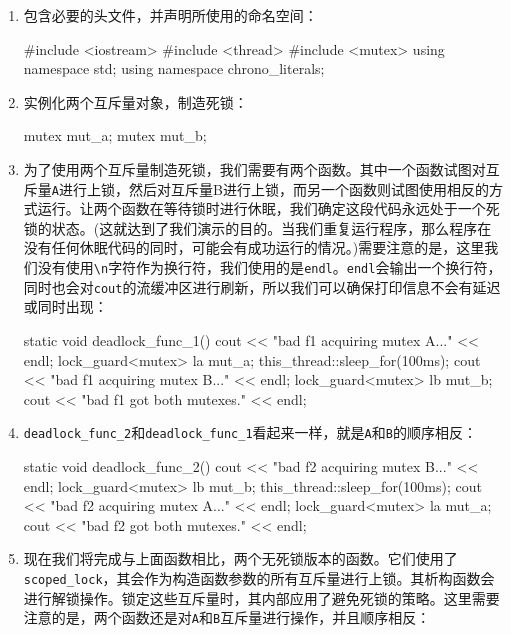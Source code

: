 \begin{enumerate}
\item 包含必要的头文件，并声明所使用的命名空间：

\begin{codebox}[cpp]
#include <iostream>
#include <thread>
#include <mutex>
using namespace std;
using namespace chrono_literals;
\end{codebox}

\item 实例化两个互斥量对象，制造死锁：

\begin{codebox}[cpp]
mutex mut_a;
mutex mut_b;
\end{codebox}

\item 为了使用两个互斥量制造死锁，我们需要有两个函数。其中一个函数试图对互斥量\texttt{A}进行上锁，然后对互斥量B进行上锁，而另一个函数则试图使用相反的方式运行。让两个函数在等待锁时进行休眠，我们确定这段代码永远处于一个死锁的状态。(这就达到了我们演示的目的。当我们重复运行程序，那么程序在没有任何休眠代码的同时，可能会有成功运行的情况。)需要注意的是，这里我们没有使用\texttt{\textbackslash{}n}字符作为换行符，我们使用的是\texttt{endl}。\texttt{endl}会输出一个换行符，同时也会对\texttt{cout}的流缓冲区进行刷新，所以我们可以确保打印信息不会有延迟或同时出现：

\begin{codebox}[cpp]
static void deadlock_func_1()
{
    cout << "bad f1 acquiring mutex A..." << endl;
    lock_guard<mutex> la {mut_a};
    this_thread::sleep_for(100ms);
    cout << "bad f1 acquiring mutex B..." << endl;
    lock_guard<mutex> lb {mut_b};
    cout << "bad f1 got both mutexes." << endl;
}
\end{codebox}

\item \texttt{deadlock\_func\_2}和\texttt{deadlock\_func\_1}看起来一样，就是\texttt{A}和\texttt{B}的顺序相反：

\begin{codebox}[cpp]
static void deadlock_func_2()
{
    cout << "bad f2 acquiring mutex B..." << endl;
    lock_guard<mutex> lb {mut_b};
    this_thread::sleep_for(100ms);
    cout << "bad f2 acquiring mutex A..." << endl;
    lock_guard<mutex> la {mut_a};
    cout << "bad f2 got both mutexes." << endl;
}
\end{codebox}

\item 现在我们将完成与上面函数相比，两个无死锁版本的函数。它们使用了\texttt{scoped\_lock}，其会作为构造函数参数的所有互斥量进行上锁。其析构函数会进行解锁操作。锁定这些互斥量时，其内部应用了避免死锁的策略。这里需要注意的是，两个函数还是对\texttt{A}和\texttt{B}互斥量进行操作，并且顺序相反：


\end{enumerate}
